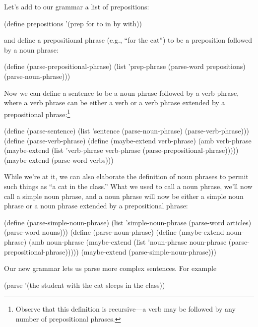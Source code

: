 Let's add to our grammar a list of prepositions:

\begin{codeBlock}
(define prepositions '(prep for to in by with))
\end{codeBlock}

\noindent
and define a prepositional phrase (e.g., ``for the cat'') to be a preposition
followed by a noun phrase:

\begin{codeBlock}
(define (parse-prepositional-phrase)
  (list 'prep-phrase
        (parse-word prepositions)
        (parse-noun-phrase)))
\end{codeBlock}

\noindent
Now we can define a sentence to be a noun phrase followed by a verb phrase,
where a verb phrase can be either a verb or a verb phrase extended by a
prepositional phrase:\footnote{Observe that this definition is recursive---a
verb may be followed by any number of prepositional phrases.}

\begin{codeBlock}
(define (parse-sentence)
  (list 'sentence (parse-noun-phrase) (parse-verb-phrase)))
(define (parse-verb-phrase)
  (define (maybe-extend verb-phrase)
    (amb verb-phrase
         (maybe-extend
          (list 'verb-phrase
                verb-phrase
                (parse-prepositional-phrase)))))
  (maybe-extend (parse-word verbs)))
\end{codeBlock}

\noindent
While we're at it, we can also elaborate the definition of noun phrases to
permit such things as ``a cat in the class.''  What we used to call a noun
phrase, we'll now call a simple noun phrase, and a noun phrase will now be
either a simple noun phrase or a noun phrase extended by a prepositional
phrase:

\begin{codeBlock}
(define (parse-simple-noun-phrase)
  (list 'simple-noun-phrase
        (parse-word articles)
        (parse-word nouns)))
(define (parse-noun-phrase)
  (define (maybe-extend noun-phrase)
    (amb noun-phrase
         (maybe-extend
          (list 'noun-phrase
                noun-phrase
                (parse-prepositional-phrase)))))
  (maybe-extend (parse-simple-noun-phrase)))
\end{codeBlock}

\noindent
Our new grammar lets us parse more complex sentences.  For example

\begin{codeBlock}
(parse '(the student with the cat sleeps in the class))
\end{codeBlock}

